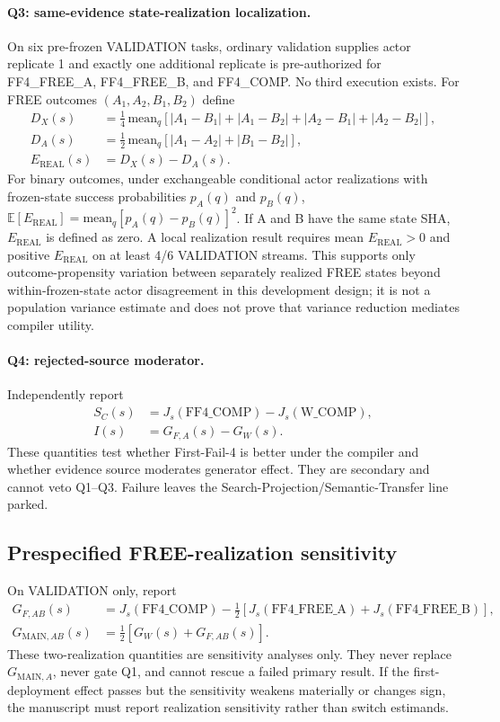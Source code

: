 \paragraph{Q3: same-evidence state-realization localization.}
On six pre-frozen VALIDATION tasks, ordinary validation supplies actor replicate 1 and exactly one additional replicate is pre-authorized for FF4\_FREE\_A, FF4\_FREE\_B, and FF4\_COMP. No third execution exists. For FREE outcomes $(A_1,A_2,B_1,B_2)$ define
\begin{align}
D_X(s) &= \tfrac{1}{4}\,\mathrm{mean}_q\left[|A_1-B_1|+|A_1-B_2|+|A_2-B_1|+|A_2-B_2|\right],\\
D_A(s) &= \tfrac{1}{2}\,\mathrm{mean}_q\left[|A_1-A_2|+|B_1-B_2|\right],\\
E_{\mathrm{REAL}}(s) &= D_X(s)-D_A(s).
\end{align}
For binary outcomes, under exchangeable conditional actor realizations with frozen-state success probabilities $p_A(q)$ and $p_B(q)$, $\mathbb{E}[E_{\mathrm{REAL}}]=\mathrm{mean}_q[p_A(q)-p_B(q)]^2$. If A and B have the same state SHA, $E_{\mathrm{REAL}}$ is defined as zero. A local realization result requires mean $E_{\mathrm{REAL}}>0$ and positive $E_{\mathrm{REAL}}$ on at least 4/6 VALIDATION streams. This supports only outcome-propensity variation between separately realized FREE states beyond within-frozen-state actor disagreement in this development design; it is not a population variance estimate and does not prove that variance reduction mediates compiler utility.

\paragraph{Q4: rejected-source moderator.}
Independently report
\begin{align}
S_C(s) &= J_s(\text{FF4\_COMP})-J_s(\text{W\_COMP}),\\
I(s) &= G_{F,A}(s)-G_W(s).
\end{align}
These quantities test whether First-Fail-4 is better under the compiler and whether evidence source moderates generator effect. They are secondary and cannot veto Q1--Q3. Failure leaves the Search-Projection/Semantic-Transfer line parked.

\subsection{Prespecified FREE-realization sensitivity}
On VALIDATION only, report
\begin{align}
G_{F,AB}(s) &= J_s(\text{FF4\_COMP})-\tfrac{1}{2}[J_s(\text{FF4\_FREE\_A})+J_s(\text{FF4\_FREE\_B})],\\
G_{\mathrm{MAIN},AB}(s) &= \tfrac{1}{2}[G_W(s)+G_{F,AB}(s)].
\end{align}
These two-realization quantities are sensitivity analyses only. They never replace $G_{\mathrm{MAIN},A}$, never gate Q1, and cannot rescue a failed primary result. If the first-deployment effect passes but the sensitivity weakens materially or changes sign, the manuscript must report realization sensitivity rather than switch estimands.

